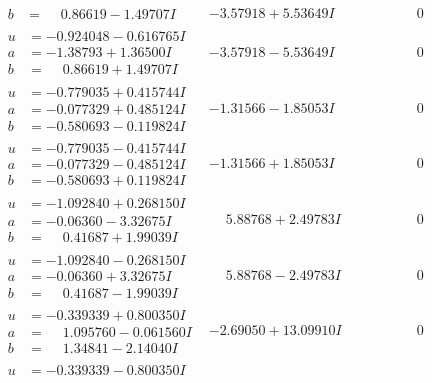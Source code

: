 \documentclass[1p]{elsarticle_modified}
\theoremstyle{definition}
\begin{document}
$$\begin{array}{c|c|c}
\begin{aligned}
b &= \phantom{-}0.86619 - 1.49707 I\end{aligned}
 & -3.57918 + 5.53649 I & \phantom{-0.000000 } 0 \\ \hline\begin{aligned}
u &= -0.924048 - 0.616765 I \\
a &= -1.38793 + 1.36500 I \\
b &= \phantom{-}0.86619 + 1.49707 I\end{aligned}
 & -3.57918 - 5.53649 I & \phantom{-0.000000 } 0 \\ \hline\begin{aligned}
u &= -0.779035 + 0.415744 I \\
a &= -0.077329 + 0.485124 I \\
b &= -0.580693 - 0.119824 I\end{aligned}
 & -1.31566 - 1.85053 I & \phantom{-0.000000 } 0 \\ \hline\begin{aligned}
u &= -0.779035 - 0.415744 I \\
a &= -0.077329 - 0.485124 I \\
b &= -0.580693 + 0.119824 I\end{aligned}
 & -1.31566 + 1.85053 I & \phantom{-0.000000 } 0 \\ \hline\begin{aligned}
u &= -1.092840 + 0.268150 I \\
a &= -0.06360 - 3.32675 I \\
b &= \phantom{-}0.41687 + 1.99039 I\end{aligned}
 & \phantom{-}5.88768 + 2.49783 I & \phantom{-0.000000 } 0 \\ \hline\begin{aligned}
u &= -1.092840 - 0.268150 I \\
a &= -0.06360 + 3.32675 I \\
b &= \phantom{-}0.41687 - 1.99039 I\end{aligned}
 & \phantom{-}5.88768 - 2.49783 I & \phantom{-0.000000 } 0 \\ \hline\begin{aligned}
u &= -0.339339 + 0.800350 I \\
a &= \phantom{-}1.095760 - 0.061560 I \\
b &= \phantom{-}1.34841 - 2.14040 I\end{aligned}
 & -2.69050 + 13.09910 I & \phantom{-0.000000 } 0 \\ \hline\begin{aligned}
u &= -0.339339 - 0.800350 I \\

\end{aligned}
\end{array}$$
\end{document}
